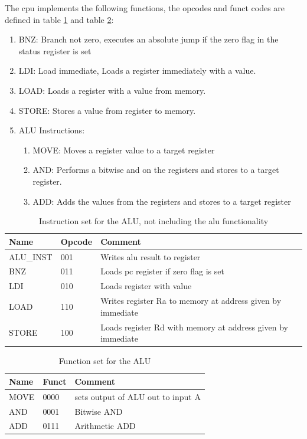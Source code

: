 \documentclass[11pt]{report}
\begin{document}
The cpu implements the following functions, the opcodes and funct 
codes are defined in table \ref{tab:opcodes} and table \ref{tab:functcodes}:
\begin{enumerate}
  \item BNZ: Branch not zero, executes an absolute jump if the zero flag in the status register is set
  \item LDI: Load immediate, Loads a register immediately with a value.
  \item LOAD: Loads a register with a value from memory.
  \item STORE: Stores a value from register to memory.
  \item ALU Instructions:
  \begin{enumerate}
    \item MOVE: Moves a register value to a target register
    \item AND: Performs a bitwise and on the registers and stores to a target register.
    \item ADD: Adds the values from the registers and stores to a target register
  \end{enumerate}
\end{enumerate}

\begin{table}[h]
  \centering
  \begin{tabular}{|l|l|l|}
    \hline
    Name&Opcode&Comment \\
    \hline
    ALU\_INST	&001	&Writes alu result to register\\
    BNZ			&011	&Loads pc register if zero flag is set\\
    LDI			&010	&Loads register with value\\
    LOAD		&110	&Writes register Ra to memory at address given by immediate\\
    STORE		&100	&Loads register Rd with memory at address given by immediate\\
    \hline
  \end{tabular}
  \caption{Instruction set for the ALU, not including the alu functionality}
  \label{tab:opcodes}
\end{table}

\begin{table}[h]
  \centering
  \begin{tabular}{|l|l|l|}
    \hline
    Name&Funct&Comment \\
    \hline
    MOVE	&0000	& sets output of ALU out to input A\\
    AND		&0001	& Bitwise AND\\
    ADD		&0111	& Arithmetic ADD\\
    \hline
  \end{tabular}
  \caption{Function set for the ALU}
  \label{tab:functcodes}
\end{table}
\end{document}
